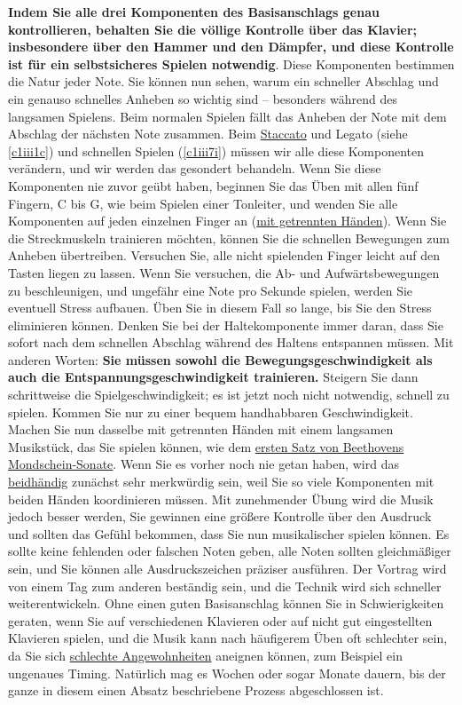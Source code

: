 \textbf{Indem Sie alle drei Komponenten des Basisanschlags genau kontrollieren, behalten Sie die völlige Kontrolle über das Klavier; insbesondere über den Hammer und den Dämpfer, und diese Kontrolle ist für ein selbstsicheres Spielen notwendig}.
Diese Komponenten bestimmen die Natur jeder Note.
Sie können nun sehen, warum ein schneller Abschlag und ein genauso schnelles Anheben so wichtig sind -- besonders während des langsamen Spielens.
Beim normalen Spielen fällt das Anheben der Note mit dem Abschlag der nächsten Note zusammen.
Beim \hyperref[c1iii1c]{Staccato} und Legato (siehe \autoref{c1iii1c}) und schnellen Spielen (\ref{c1iii7i}) müssen wir alle diese Komponenten verändern, und wir werden das gesondert behandeln.
Wenn Sie diese Komponenten nie zuvor geübt haben, beginnen Sie das Üben mit allen fünf Fingern, C bis G, wie beim Spielen einer Tonleiter, und wenden Sie alle Komponenten auf jeden einzelnen Finger an (\hyperref[c1ii7]{mit getrennten Händen}).
Wenn Sie die Streckmuskeln trainieren möchten, können Sie die schnellen Bewegungen zum Anheben übertreiben.
Versuchen Sie, alle nicht spielenden Finger leicht auf den Tasten liegen zu lassen.
Wenn Sie versuchen, die Ab- und Aufwärtsbewegungen zu beschleunigen, und ungefähr eine Note pro Sekunde spielen, werden Sie eventuell Stress aufbauen.
Üben Sie in diesem Fall so lange, bis Sie den Stress eliminieren können.
Denken Sie bei der Haltekomponente immer daran, dass Sie sofort nach dem schnellen Abschlag während des Haltens entspannen müssen.
Mit anderen Worten: \textbf{Sie müssen sowohl die Bewegungsgeschwindigkeit als auch die Entspannungsgeschwindigkeit trainieren.}
Steigern Sie dann schrittweise die Spielgeschwindigkeit; es ist jetzt noch nicht notwendig, schnell zu spielen.
Kommen Sie nur zu einer bequem handhabbaren Geschwindigkeit.
Machen Sie nun dasselbe mit getrennten Händen mit einem langsamen Musikstück, das Sie spielen können, wie dem \hyperref[c1ii25b]{ersten Satz von Beethovens Mondschein-Sonate}.
Wenn Sie es vorher noch nie getan haben, wird das \hyperref[c1ii25]{beidhändig} zunächst sehr merkwürdig sein, weil Sie so viele Komponenten mit beiden Händen koordinieren müssen.
Mit zunehmender Übung wird die Musik jedoch besser werden, Sie gewinnen eine größere Kontrolle über den Ausdruck und sollten das Gefühl bekommen, dass Sie nun musikalischer spielen können.
Es sollte keine fehlenden oder falschen Noten geben, alle Noten sollten gleichmäßiger sein, und Sie können alle Ausdruckszeichen präziser ausführen.
Der Vortrag wird von einem Tag zum anderen beständig sein, und die Technik wird sich schneller weiterentwickeln.
Ohne einen guten Basisanschlag können Sie in Schwierigkeiten geraten, wenn Sie auf verschiedenen Klavieren oder auf nicht gut eingestellten Klavieren spielen, und die Musik kann nach häufigerem Üben oft schlechter sein, da Sie sich \hyperref[c1ii22]{schlechte Angewohnheiten} aneignen können, zum Beispiel ein ungenaues Timing.
Natürlich mag es Wochen oder sogar Monate dauern, bis der ganze in diesem einen Absatz beschriebene Prozess abgeschlossen ist.



